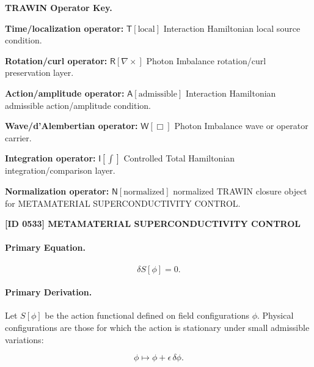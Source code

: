 \par\vspace{0.45\baselineskip}
\noindent\begin{minipage}[t]{\linewidth}
\begingroup
\small
\raggedright
\textbf{TRAWIN Operator Key.}\par
\noindent\textbf{Time/localization operator:} $\mathsf{T}\!\left[\mathrm{local}\right]$ Interaction Hamiltonian local source condition.\par
\noindent\textbf{Rotation/curl operator:} $\mathsf{R}\!\left[\nabla\times\right]$ Photon Imbalance rotation/curl preservation layer.\par
\noindent\textbf{Action/amplitude operator:} $\mathsf{A}\!\left[\mathrm{admissible}\right]$ Interaction Hamiltonian admissible action/amplitude condition.\par
\noindent\textbf{Wave/d'Alembertian operator:} $\mathsf{W}\!\left[\Box\right]$ Photon Imbalance wave or operator carrier.\par
\noindent\textbf{Integration operator:} $\mathsf{I}\!\left[\int\right]$ Controlled Total Hamiltonian integration/comparison layer.\par
\noindent\textbf{Normalization operator:} $\mathsf{N}\!\left[\mathrm{normalized}\right]$ normalized TRAWIN closure object for METAMATERIAL SUPERCONDUCTIVITY CONTROL.\par
\endgroup
\end{minipage}

\clearpage
\noindent\textbf{[ID 0533] METAMATERIAL SUPERCONDUCTIVITY CONTROL}\par
\vspace{0.35em}
\paragraph{Primary Equation.}
\begin{equation}
\delta S[\phi]=0 .
\end{equation}

\paragraph{Primary Derivation.}
Let $S[\phi]$ be the action functional defined on field configurations $\phi$.  
Physical configurations are those for which the action is stationary under small admissible variations:

\begin{equation}
\phi \mapsto \phi+\epsilon\,\delta\phi .
\end{equation}

